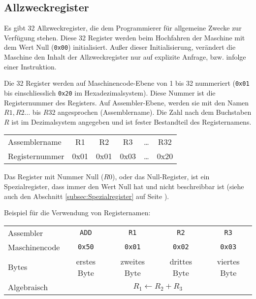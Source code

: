 \subsection{Allzweckregister}

Es gibt 32 Allzweckregister, die dem Programmierer für allgemeine Zwecke zur
Verfügung stehen. Diese 32 Register werden beim Hochfahren der Maschine mit dem
Wert Null (\texttt{0x00}) initialisiert. Außer dieser Initialisierung, verändert
die Maschine den Inhalt der Allzweckregister nur auf explizite Anfrage, bzw.
infolge einer Instruktion. 

Die 32 Register werden auf Maschinencode-Ebene von 1 bis 32 nummeriert
(\texttt{0x01} bis einschliesslich \texttt{0x20} im Hexadezimalsystem). Diese
Nummer ist die \gls{Registernummer} des Registers. Auf Assembler-Ebene, werden
sie mit den Namen $R1, R2\dots$ bis $R32$ angesprochen (Assemblername). Die Zahl
nach dem Buchstaben $R$ ist im Dezimalsystem angegeben und ist fester
Bestandteil des Registernamens.

\begin{center}
  \begin{tabular}{l||*{5}{T|}}
    Assemblername  & R1   & R2   & R3   & \dots & R32 \\
    Registernummer & 0x01 & 0x01 & 0x03 & \dots & 0x20
  \end{tabular}
\end{center}

Das Register mit Nummer Null ($R0$), oder das
Null-Register, ist ein
Spezialregister, dass immer den Wert Null hat und nicht beschreibbar ist (siehe
auch den Abschnitt \ref{subsec:Spezialregister} auf Seite
\pageref{subsec:Spezialregister}).

Beispiel für die Verwendung von Registernamen:
\begin{center}
  \begin{tabular}{|l||*{4}{c|}}                                       \hline
    Assembler     & \texttt{ADD}  & \texttt{R1}   & \texttt{R2}   &
                    \texttt{R3}                                      \\
    Maschinencode & \texttt{0x50} & \texttt{0x01} & \texttt{0x02} &
                    \texttt{0x03}                                    \\\hline
    Bytes         & erstes Byte   & zweites Byte  & drittes Byte  & 
                    viertes Byte                                     \\\hline
    Algebraisch   & \multicolumn{4}{c|}{$R_{1} \gets R_{2} + R_{3}$} \\\hline
  \end{tabular}
\end{center}



